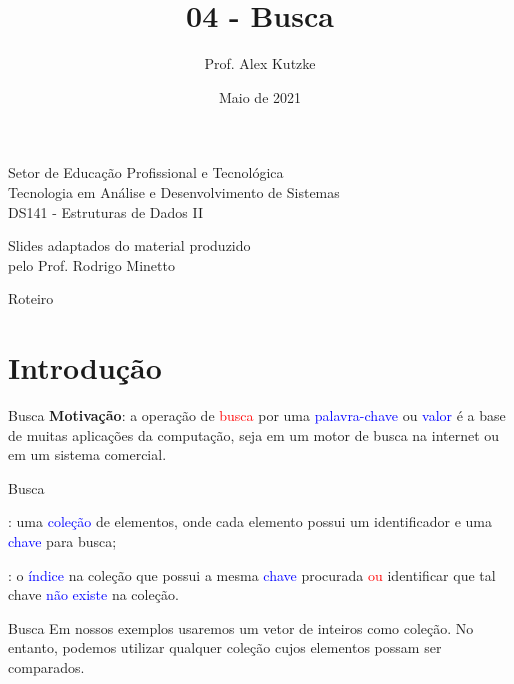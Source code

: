 \documentclass{beamer}
\title{04 - Busca}
\author{Prof. Alex Kutzke}
\date{Maio de 2021}
\newcommand{\tcb}[1]{\textcolor{blue}{#1}}
\newcommand{\tcr}[1]{\textcolor{red}{#1}}
\begin{document}
	\begin{frame}
		\begin{center}
			\large{Setor de Educação Profissional e Tecnológica}\\
			Tecnologia em Análise e Desenvolvimento de Sistemas\\
			\vspace{1cm}			
			\small{DS141 - Estruturas de Dados II}
		\end{center}
		\titlepage
		\begin{center}
			Slides adaptados do material produzido\\pelo Prof. Rodrigo Minetto
		\end{center}
	\end{frame}

	\begin{frame}[c]{Roteiro}
		\tableofcontents

	\end{frame}

	\section{Introdução}

	\begin{frame}[c]{Busca}
		\textbf{Motivação}: a operação de \tcr{busca} por uma \tcb{palavra-chave}
		ou \tcb{valor} é a base de muitas aplicações da computação, seja em um 
		motor de busca na internet ou em um sistema comercial.
	\end{frame}

	\begin{frame}[c]{Busca}
		\begin{description}
			\justifying
			\item[O problema]: uma \tcb{coleção} de elementos, onde cada elemento possui
				um identificador e uma \tcb{chave} para busca;
			\item[Saída]: o \tcb{índice} na coleção que possui a mesma \tcb{chave} procurada
				\tcr{ou} identificar que tal chave \tcb{não existe} na coleção.
		\end{description}
	\end{frame}

	\begin{frame}[c]{Busca}
		Em nossos exemplos usaremos um vetor de inteiros como coleção. No entanto,
		podemos utilizar qualquer coleção cujos elementos possam ser comparados.
	\end{frame}
\end{document}
